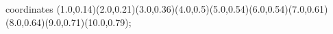 					coordinates { (1.0,0.14)(2.0,0.21)(3.0,0.36)(4.0,0.5)(5.0,0.54)(6.0,0.54)(7.0,0.61)(8.0,0.64)(9.0,0.71)(10.0,0.79)};